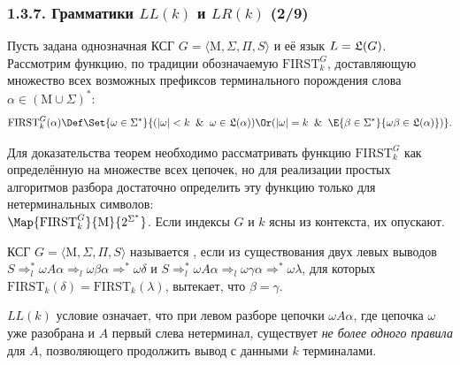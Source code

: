 \begin{frame}
\frametitle{1.3.7. Грамматики $LL(k)$ и $LR(k)$ (2/9)}
Пусть задана однозначная КСГ $G=\langle \mathrm{M}, \Sigma, \Pi, S \rangle$ и её язык 
$L = \frak{L}(G)$. Рассмотрим функцию, по традиции обозначаемую
$\mathrm{FIRST}^G_k$, доставляющую множество всех 
возможных префиксов терминального порождения слова $\alpha\in(\mathrm{M}\cup\Sigma)^*$:      
$$
    \mathrm{FIRST}_k^G(\alpha) \Def
    \Set{\omega\in\Sigma^*}{(|\omega| < k \And \omega\in\frak{L}(\alpha))
    \Or (|\omega| = k \And \E{\beta\in\Sigma^*}{\omega\beta\in\frak{L}(\alpha) })}.
$$
\begin{remark}
Для доказательства теорем необходимо рассматривать 
функцию $\mathrm{FIRST}^G_k$ как определённую на множестве всех
цепочек, но для реализации простых алгоритмов разбора 
достаточно определить эту функцию только для нетерминальных символов:\\
$\Map{\mathrm{FIRST}^G_k}{\mathrm{M}}{2^{\Sigma^*}}$. 
Если индексы $G$ и $k$ ясны из контекста, их опускают.   
\end{remark}

\smallskip
КСГ $G=\langle \mathrm{M}, \Sigma, \Pi, S \rangle$ 
называется ,
 если из существования двух левых выводов
$ S \Rightarrow_l^* \omega A\alpha \Rightarrow_l \omega\beta\alpha \Rightarrow^* \omega
\delta $ и
$ S \Rightarrow_l^* \omega A\alpha \Rightarrow_l \omega\gamma\alpha \Rightarrow^* \omega\lambda $,
для которых \( \mathrm{FIRST}_k(\delta) = \mathrm{FIRST}_k(\lambda) \), вытекает, 
что \( \beta = \gamma \).

\begin{remark} $LL(k)$ условие означает, что при левом разборе
цепочки \( \omega A\alpha \), где цепочка $\omega$ уже разобрана и $A$ первый слева нетерминал, существует {\em не более одного правила} для \( A \), позволяющего продолжить вывод с данными \( k \) терминалами.
\end{remark}
\end{frame}

